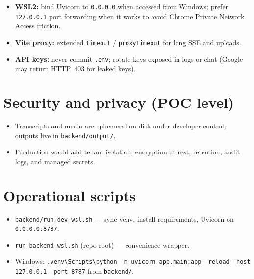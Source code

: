 \documentclass[11pt,a4paper]{article}
\begin{document}
\begin{itemize}
  \item \textbf{WSL2:} bind Uvicorn to \texttt{0.0.0.0} when accessed from Windows; prefer \texttt{127.0.0.1} port forwarding when it works to avoid Chrome Private Network Access friction.
  \item \textbf{Vite proxy:} extended \texttt{timeout} / \texttt{proxyTimeout} for long SSE and uploads.
  \item \textbf{API keys:} never commit \texttt{.env}; rotate keys exposed in logs or chat (Google may return HTTP~403 for leaked keys).
\end{itemize}

\section{Security and privacy (POC level)}

\begin{itemize}
  \item Transcripts and media are ephemeral on disk under developer control; outputs live in \texttt{backend/output/}.
  \item Production would add tenant isolation, encryption at rest, retention, audit logs, and managed secrets.
\end{itemize}

\section{Operational scripts}

\begin{itemize}
  \item \texttt{backend/run\_dev\_wsl.sh} --- sync venv, install requirements, Uvicorn on \texttt{0.0.0.0:8787}.
  \item \texttt{run\_backend\_wsl.sh} (repo root) --- convenience wrapper.
  \item Windows: \texttt{.venv\textbackslash Scripts\textbackslash python -m uvicorn app.main:app --reload --host 127.0.0.1 --port 8787} from \texttt{backend/}.
\end{itemize}

\end{document}
